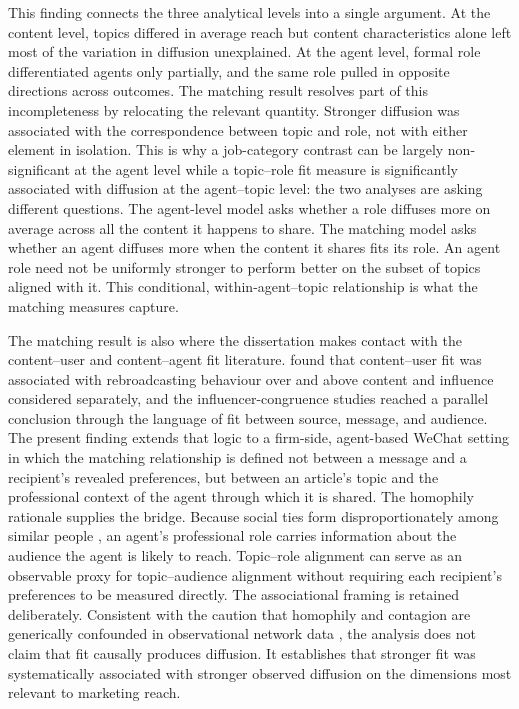 This finding connects the three analytical levels into a single argument. At the content level, topics differed in average reach but content characteristics alone left most of the variation in diffusion unexplained. At the agent level, formal role differentiated agents only partially, and the same role pulled in opposite directions across outcomes. The matching result resolves part of this incompleteness by relocating the relevant quantity. Stronger diffusion was associated with the correspondence between topic and role, not with either element in isolation. This is why a job-category contrast can be largely non-significant at the agent level while a topic–role fit measure is significantly associated with diffusion at the agent–topic level: the two analyses are asking different questions. The agent-level model asks whether a role diffuses more on average across all the content it happens to share. The matching model asks whether an agent diffuses more when the content it shares fits its role. An agent role need not be uniformly stronger to perform better on the subset of topics aligned with it. This conditional, within-agent–topic relationship is what the matching measures capture.

The matching result is also where the dissertation makes contact with the content–user and content–agent fit literature. \textcite{zhang2017} found that content–user fit was associated with rebroadcasting behaviour over and above content and influence considered separately, and the influencer-congruence studies \parencite{belanche2021,breves2019} reached a parallel conclusion through the language of fit between source, message, and audience. The present finding extends that logic to a firm-side, agent-based WeChat setting in which the matching relationship is defined not between a message and a recipient's revealed preferences, but between an article's topic and the professional context of the agent through which it is shared. The homophily rationale supplies the bridge. Because social ties form disproportionately among similar people \parencite{mcpherson2001}, an agent's professional role carries information about the audience the agent is likely to reach. Topic–role alignment can serve as an observable proxy for topic–audience alignment without requiring each recipient's preferences to be measured directly. The associational framing is retained deliberately. Consistent with the caution that homophily and contagion are generically confounded in observational network data \parencite{shalizi2011}, the analysis does not claim that fit causally produces diffusion. It establishes that stronger fit was systematically associated with stronger observed diffusion on the dimensions most relevant to marketing reach.

